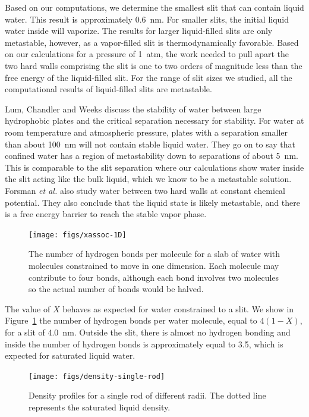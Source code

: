 \documentclass[letterpaper,twocolumn,amsmath,amssymb,prb]{revtex4-1}
\begin{document}
Based on our computations, we determine the smallest slit that can contain 
liquid water. This result is
approximately 0.6~nm. For smaller slits, the initial liquid water inside will
vaporize. The results for larger liquid-filled slits are only metastable,
however, as a vapor-filled slit is thermodynamically favorable. Based on our
calculations for a pressure of 1~atm, the work needed to pull apart
the two hard walls comprising the slit is one to two orders of magnitude less
than the free energy of the liquid-filled slit. For the range of slit sizes we
studied, all the computational results of liquid-filled slits are
metastable. 

Lum, Chandler and Weeks \cite{lum1999hydrophobicity} discuss the
stability of water between large hydrophobic plates and the critical separation
necessary for stability. For water at room temperature and atmospheric pressure,
plates with a separation smaller than about 100~nm will not contain stable liquid
water. They go on to say that confined water has a region of metastability down
to separations of about 5~nm. This is comparable to the slit separation where
our calculations show water inside the slit acting like the bulk liquid, which
we know to be a metastable solution. Forsman \emph{et al.}\cite{forsman1996computer}
also study water between two hard walls at constant chemical potential. They 
also conclude that the liquid state is likely metastable, and there is a free
energy barrier to reach the stable vapor phase. 

\begin{figure}
\begin{center}
\texttt{[image: figs/xassoc-1D]}
\end{center}
\caption{The number of hydrogen bonds per molecule for a slab of water 
with molecules constrained to move in one dimension. Each molecule may
contribute to
four bonds, although each bond involves two molecules so the
actual number of bonds would be halved.}
\label{fig:xassoc-1D}
\end{figure}

The value of $X$ behaves as expected for water constrained to a slit. We
show in Figure~\ref{fig:xassoc-1D} the number of hydrogen bonds per water 
molecule, equal to $4(1-X)$, for a slit of 4.0~nm.
Outside the slit, there is almost no hydrogen bonding and inside the number of hydrogen
bonds is approximately equal to 3.5, which is expected for saturated liquid
water.

\begin{figure}
\begin{center}
\texttt{[image: figs/density-single-rod]}
\end{center}
\caption{ Density profiles for a single rod of different radii. The dotted line
represents the saturated liquid density.  }
\label{fig:density-single-rod}
\end{figure}
\end{document}
